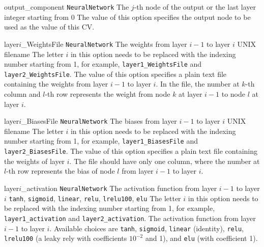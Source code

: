\begin{cvcoptions}

\item %
  \key
  {output\_component}%
  {\texttt{NeuralNetwork}}%
  {The $j$-th node of the output or the last layer}%
  {integer starting from 0}%
  {The value of this option specifies the output node to be used as
   the value of this CV.}

\item %
  \key
  {layer$i$\_WeightsFile}%
  {\texttt{NeuralNetwork}}%
  {The weights from layer $i-1$ to layer $i$}%
  {UNIX filename}%
  {The letter $i$ in this option needs to be replaced with the indexing
   number starting from 1, for example, \texttt{layer1\_WeightsFile} and
   \texttt{layer2\_WeightsFile}. The value of this option specifies a
   plain text file containing the weights from layer $i-1$ to layer $i$.
   In the file, the number at $k$-th column and $l$-th row represents the
   weight from node $k$ at layer $i-1$ to node $l$ at layer $i$.}

\item %
  \key
  {layer$i$\_BiasesFile}%
  {\texttt{NeuralNetwork}}%
  {The biases from layer $i-1$ to layer $i$}%
  {UNIX filename}%
  {The letter $i$ in this option needs to be replaced with the indexing
   number starting from 1, for example, \texttt{layer1\_BiasesFile} and
   \texttt{layer2\_BiasesFile}. The value of this option specifies a plain
   text file containing the weights of layer $i$. The file should have
   only one column, where the number at $l$-th row represents the bias of
   node $l$ from layer $i-1$ to layer $i$.}

\item %
  \key
  {layer$i$\_activation}%
  {\texttt{NeuralNetwork}}%
  {The activation function from layer $i-1$ to layer $i$}%
  {\texttt{tanh}, \texttt{sigmoid}, \texttt{linear}, \texttt{relu}, \texttt{lrelu100}, \texttt{elu} }%
  {The letter $i$ in this option needs to be replaced with the indexing
   number starting from 1, for example, \texttt{layer1\_activation} and
   \texttt{layer2\_activation}. The activation function from layer $i-1$
   to layer $i$. Available choices are \texttt{tanh},
  \texttt{sigmoid}, \texttt{linear} (identity), \texttt{relu}, \texttt{lrelu100}
  (a leaky rely with coefficients $10^{-2}$ and 1), and \texttt{elu} (with coefficient 1).}


\end{cvcoptions}

